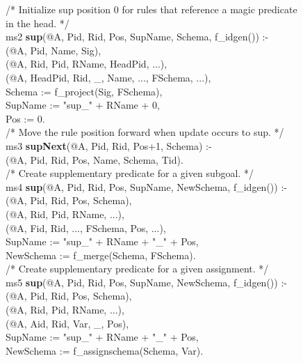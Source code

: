 \begin{figure}[!t]
\ssp
\centering
\begin{boxedminipage}{\linewidth}
/* Initialize sup position 0 for rules that reference a magic predicate in the head. */ \\
ms2 {\bf sup}(@A, Pid, Rid, Pos, SupName, Schema, f\_idgen()) :- \\
(@A, Pid, Name, Sig), \\
(@A, Rid, Pid, RName, HeadPid, ...), \\
(@A, HeadPid, Rid, \_, Name, ..., FSchema, ...), \\
\datalogspace Schema := f\_project(Sig, FSchema), \\
\datalogspace SupName := "sup\_" + RName + 0, \\
\datalogspace Pos := 0. \\

/* Move the rule position forward when update occurs to sup. */ \\
ms3 {\bf supNext}(@A, Pid, Rid, Pos+1, Schema) :- \\
(@A, Pid, Rid, Pos, Name, Schema, Tid). \\
	
/* Create supplementary predicate for a given subgoal. */ \\
ms4 {\bf sup}(@A, Pid, Rid, Pos, SupName, NewSchema, f\_idgen()) :- \\
(@A, Pid, Rid, Pos, Schema), \\
(@A, Rid, Pid, RName, ...), \\
(@A, Fid, Rid, ..., FSchema, Pos, ...), \\
\datalogspace SupName := "sup\_" + RName + "\_" + Pos, \\
\datalogspace NewSchema := f\_merge(Schema, FSchema). \\
	
/* Create supplementary predicate for a given assignment. */ \\
ms5 {\bf sup}(@A, Pid, Rid, Pos, SupName, NewSchema, f\_idgen()) :- \\
(@A, Pid, Rid, Pos, Schema), \\
(@A, Rid, Pid, RName, ...), \\
(@A, Aid, Rid, Var, \_, Pos), \\
\datalogspace SupName := "sup\_" + RName + "\_" + Pos, \\
\datalogspace NewSchema := f\_assignschema(Schema, Var). \\ 
	

\end{boxedminipage}
\end{figure}
